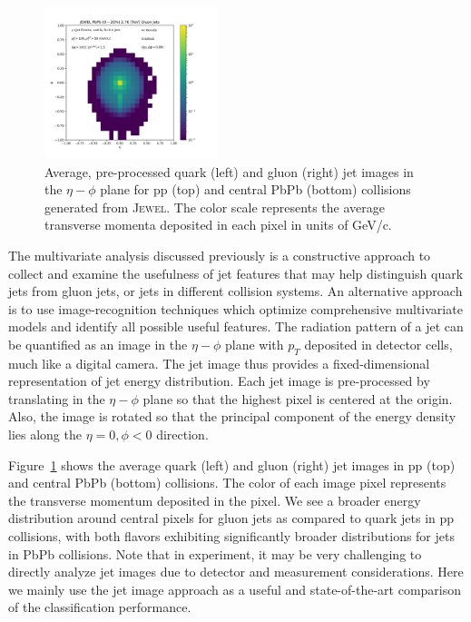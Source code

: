 \documentclass[notoc,preprintnumbers]{JHEP3}
\begin{document}
\begin{figure}[t]
\includegraphics[width=0.45\textwidth]{plots/JEWEL_pbpb020_2p76TeV_AverageGluonJet_Ypt100_jpt50.pdf}
\caption{Average, pre-processed quark (left) and gluon (right) jet images in the $\eta-\phi$ plane for pp (top) and central PbPb (bottom) collisions generated from \textsc{Jewel}. The color scale represents the average transverse momenta deposited in each pixel in units of GeV/c. }
\label{fig:qgjetimages}
\end{figure}

The multivariate analysis discussed previously is a constructive approach to collect and examine the usefulness of jet features that may help distinguish quark jets from gluon jets, or jets in different collision systems. An alternative approach is to use image-recognition techniques which optimize comprehensive multivariate models and identify all possible useful features. The radiation pattern of a jet can be quantified as an image in the $\eta-\phi$ plane with $p_T$ deposited in detector cells, much like a digital camera. The jet image thus provides a fixed-dimensional representation of jet energy distribution. Each jet image is pre-processed \cite{deOliveira:2015xxd} by translating in the $\eta-\phi$ plane so that the highest pixel is centered at the origin. Also, the image is rotated so that the principal component of the energy density lies along the $\eta=0, \phi<0$ direction.

Figure~\ref{fig:qgjetimages} shows the average quark (left) and gluon (right) jet images in pp (top) and central PbPb (bottom) collisions. The color of each image pixel represents the transverse momentum deposited in the pixel. We see a broader energy distribution around central pixels for gluon jets as compared to quark jets in pp collisions, with both flavors exhibiting significantly broader distributions for jets in PbPb collisions. Note that in experiment, it may be very challenging to directly analyze jet images due to detector and measurement considerations. Here we mainly use the jet image approach as a useful and state-of-the-art comparison of the classification performance.
	
\end{document}
